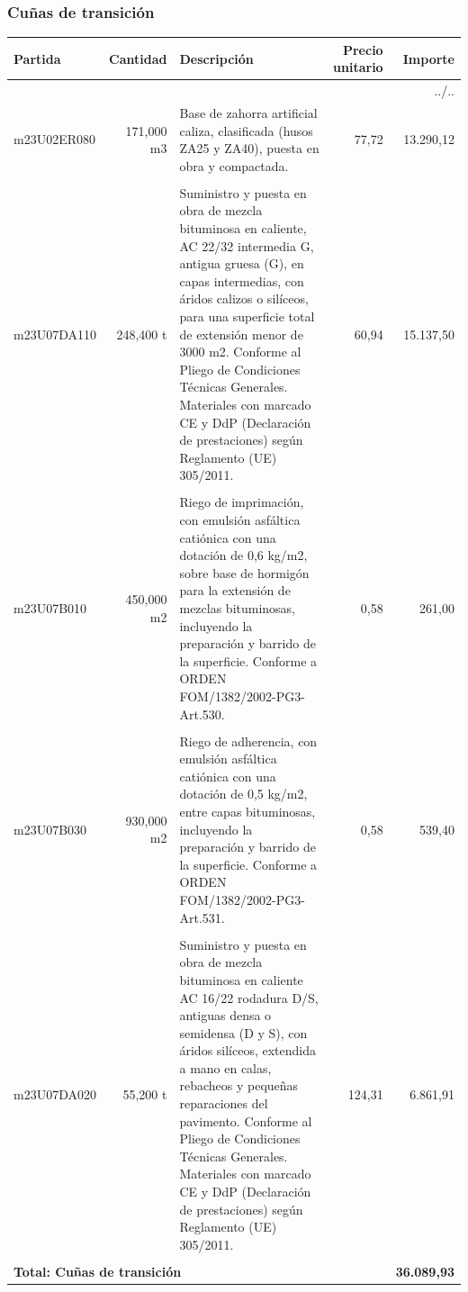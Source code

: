 \documentclass{book}%
\begin{document}
%
\subsubsection{Cuñas de transición}%
\small%
\begin{longtable}{lrlrr}%
Partida&Cantidad&Descripción&\multicolumn{1}{p{1.5cm}}{Precio unitario}&Importe\\%
\hline%
\endhead%
\multicolumn{5}{r}{../..}\\%
\endfoot%
\hline%
\endlastfoot%
m23U02ER080&   171,000 m3&\multicolumn{1}{p{5cm}}{Base de zahorra artificial caliza, clasificada (husos ZA25 y ZA40), puesta en obra y compactada.}&     77,72&13.290,12\\%
&&&&\\%
m23U07DA110&   248,400 t&\multicolumn{1}{p{5cm}}{Suministro y puesta en obra de mezcla bituminosa en caliente, AC 22/32 intermedia G, antigua gruesa (G), en capas intermedias, con áridos calizos o silíceos, para una superficie total de extensión menor de 3000 m2. Conforme al Pliego de Condiciones Técnicas Generales. Materiales con marcado CE y DdP (Declaración de prestaciones) según Reglamento (UE) 305/2011.}&     60,94&15.137,50\\%
&&&&\\%
m23U07B010&   450,000 m2&\multicolumn{1}{p{5cm}}{Riego de imprimación, con emulsión asfáltica catiónica con una dotación de 0,6 kg/m2, sobre base de hormigón para la extensión de mezclas bituminosas, incluyendo la preparación y barrido de la superficie. Conforme a ORDEN FOM/1382/2002{-}PG3{-}Art.530.}&      0,58&261,00\\%
&&&&\\%
m23U07B030&   930,000 m2&\multicolumn{1}{p{5cm}}{Riego de adherencia, con emulsión asfáltica catiónica con una dotación de 0,5 kg/m2, entre capas bituminosas, incluyendo la preparación y barrido de la superficie. Conforme a ORDEN FOM/1382/2002{-}PG3{-}Art.531.}&      0,58&539,40\\%
&&&&\\%
m23U07DA020&    55,200 t&\multicolumn{1}{p{5cm}}{Suministro y puesta en obra de mezcla bituminosa en caliente AC 16/22 rodadura D/S, antiguas densa o semidensa (D y S), con áridos silíceos, extendida a mano en calas, rebacheos y pequeñas reparaciones del pavimento. Conforme al Pliego de Condiciones Técnicas Generales. Materiales con marcado CE y DdP (Declaración de prestaciones) según Reglamento (UE) 305/2011.}&    124,31&6.861,91\\%
&&&&\\%
\multicolumn{4}{p{8cm}}{\textbf{Total: Cuñas de transición}}&\textbf{36.089,93}\\%
\end{longtable}%
\normalsize
\end{document}
